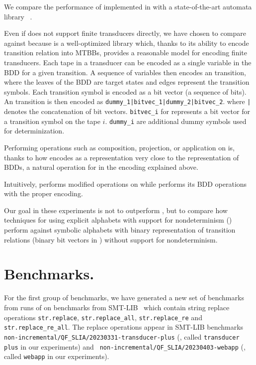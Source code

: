 We compare the performance of \nfts implemented in \mata with a state-of-the-art automata library \mona~\cite{mona}.

Even if \mona does not support finite transducers directly, we have chosen \mona to compare \mata against because \mona is a well-optimized library which, thanks to its ability to encode transition relation into MTBBs, provides a reasonable model for encoding finite transducers.
Each tape in a transducer can be encoded as a single variable in the BDD for a given transition.
A sequence of variables then encodes an \nft transition, where the leaves of the BDD are target states and edges represent the transition symbols.
Each transition symbol is encoded as a bit vector (a sequence of bits).
An \nft transition is then encoded as \texttt{dummy\_1|bitvec\_1|dummy\_2|bitvec\_2}. where \texttt{|} denotes the concatenation of bit vectors. \texttt{bitvec\_i} for represents a bit vector for a transition symbol on the tape $i$.
\texttt{dummy\_i} are additional dummy symbols used for determinization.

Performing operations such as composition, projection, or application on \nfts is, thanks to how \mata encodes \nfts as a representation very close to the representation of BDDs, a natural operation for \mona in the encoding explained above.

Intuitively, \mata performs modified \nfa operations on \nfts while \mona performs its BDD operations with the proper encoding.

Our goal in these experiments is not to outperform \mona, but to compare how techniques for \nfts using explicit alphabets with support for nondeterminism (\mata) perform against symbolic alphabets with binary representation of transition relations (binary bit vectors in \mona) without support for nondeterminism.

\section{Benchmarks.}

For the first group of benchmarks, we have generated a new set of benchmarks from runs of \noodler on benchmarks from SMT-LIB~\cite{SMTLIB} which contain string replace operations \texttt{str.replace}, \texttt{str.replace\_all}, \texttt{str.replace\_re} and \texttt{str.replace\_re\_all}.
The replace operations appear in SMT-LIB benchmarks \texttt{
non-incremental/QF\_SLIA/20230331-transducer-plus} (\transducerPlus, called \texttt{transducer plus} in our experiments) and \texttt{
non-incremental/QF\_SLIA/20230403-webapp} (\webapp, called \texttt{webapp} in our experiments).

